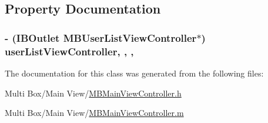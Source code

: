 \subsection{Property Documentation}
\hypertarget{interface_m_b_main_view_controller_af385841262a375418b1e66b3859cdffe}{
\subsubsection[{user\-List\-View\-Controller}]{\setlength{\rightskip}{0pt plus 5cm}-\/ (I\-B\-Outlet {\bf M\-B\-User\-List\-View\-Controller}$\ast$) user\-List\-View\-Controller\hspace{0.3cm}{\ttfamily [read]}, {\ttfamily [write]}, {\ttfamily [nonatomic]}, {\ttfamily [strong]}}}\label{interface_m_b_main_view_controller_af385841262a375418b1e66b3859cdffe}


The documentation for this class was generated from the following files\-:\begin{DoxyCompactItemize}
\item 
Multi Box/\-Main View/\hyperlink{_m_b_main_view_controller_8h}{M\-B\-Main\-View\-Controller.\-h}\item 
Multi Box/\-Main View/\hyperlink{_m_b_main_view_controller_8m}{M\-B\-Main\-View\-Controller.\-m}\end{DoxyCompactItemize}
